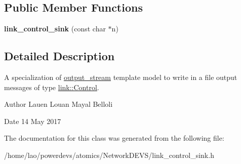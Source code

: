 \subsection*{Public Member Functions}
\begin{DoxyCompactItemize}
\item 
{\bfseries link\+\_\+control\+\_\+sink} (const char $\ast$n)\hypertarget{classlink__control__sink_aaacf4e3b053a0b5c905199aa377ae59d}{}\label{classlink__control__sink_aaacf4e3b053a0b5c905199aa377ae59d}

\end{DoxyCompactItemize}


\subsection{Detailed Description}
A specialization of \hyperlink{classoutput__stream}{output\+\_\+stream} template model to write in a file output messages of type \hyperlink{structlink_1_1Control}{link\+::\+Control}. 

\begin{DoxyAuthor}{Author}
Lauen Louan Mayal Belloli 
\end{DoxyAuthor}
\begin{DoxyDate}{Date}
14 May 2017 
\end{DoxyDate}


The documentation for this class was generated from the following file\+:\begin{DoxyCompactItemize}
\item 
/home/lao/powerdevs/atomics/\+Network\+D\+E\+V\+S/link\+\_\+control\+\_\+sink.\+h\end{DoxyCompactItemize}
